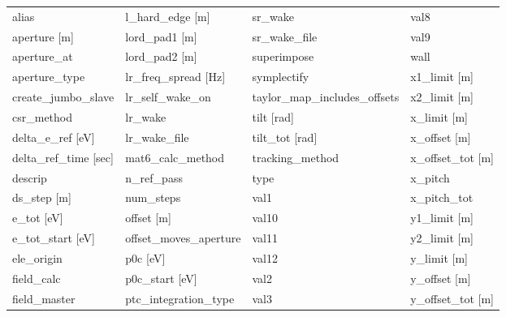  \begin{tabular}{llll} \toprule
alias                          & l_hard_edge [m]                & sr_wake                        & val8                           \\
aperture [m]                   & lord_pad1 [m]                  & sr_wake_file                   & val9                           \\
aperture_at                    & lord_pad2 [m]                  & superimpose                    & wall                           \\
aperture_type                  & lr_freq_spread [Hz]            & symplectify                    & x1_limit [m]                   \\
create_jumbo_slave             & lr_self_wake_on                & taylor_map_includes_offsets    & x2_limit [m]                   \\
csr_method                     & lr_wake                        & tilt [rad]                     & x_limit [m]                    \\
delta_e_ref [eV]               & lr_wake_file                   & tilt_tot [rad]                 & x_offset [m]                   \\
delta_ref_time [sec]           & mat6_calc_method               & tracking_method                & x_offset_tot [m]               \\
descrip                        & n_ref_pass                     & type                           & x_pitch                        \\
ds_step [m]                    & num_steps                      & val1                           & x_pitch_tot                    \\
e_tot [eV]                     & offset [m]                     & val10                          & y1_limit [m]                   \\
e_tot_start [eV]               & offset_moves_aperture          & val11                          & y2_limit [m]                   \\
ele_origin                     & p0c [eV]                       & val12                          & y_limit [m]                    \\
field_calc                     & p0c_start [eV]                 & val2                           & y_offset [m]                   \\
field_master                   & ptc_integration_type           & val3                           & y_offset_tot [m]               \\

\end{tabular}
